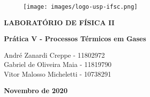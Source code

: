 \thispagestyle{empty}

\begin{figure}
  \centering
  \texttt{[image: images/logo-usp-ifsc.png]}
  \vspace*{-0.3cm}
\end{figure}

\begin{center}
{\large \rm \textbf {LABORATÓRIO DE FÍSICA II} \linebreak}
\end{center}

\baselineskip 30pt

\vspace*{0.3cm}

\begin{center}
{\LARGE \bfseries Prática V - Processos Térmicos em Gases}
\end{center}

\vspace*{1cm}

\setcounter{footnote}{1}

\renewcommand{\thefootnote}{\fnsymbol{footnote}}
\begin{center}
{
    \sc  André Zanardi Creppe - 11802972 \\
    \sc  Gabriel de Oliveira Maia - 11819790 \\
    \sc  Vitor Malosso Micheletti - 10738291 \\
}
\vspace*{0.5cm}

\vspace*{-.5cm}
\end{center}


\baselineskip 17pt

\vspace*{1.5cm}
\begin{center}
{{\bf Novembro de 2020}}
\end{center}

\vspace*{.05cm}

\renewcommand{\thefootnote}{\arabic{footnote}}

\setcounter{footnote}{1}

\pagebreak

\baselineskip 19pt
